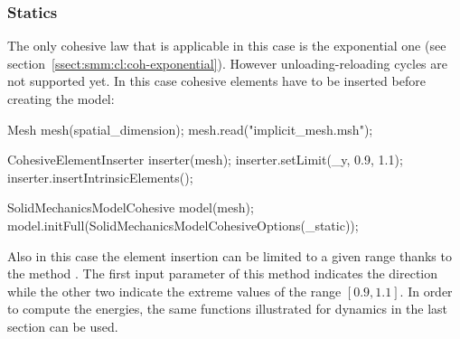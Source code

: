 \subsubsection{Statics}
The only cohesive law that is applicable in this case is the
exponential one (see
section~\ref{ssect:smm:cl:coh-exponential}). However
unloading-reloading cycles are not supported yet. In this case
cohesive elements have to be inserted before creating the
 model:
\begin{cpp}
  Mesh mesh(spatial_dimension);
  mesh.read("implicit_mesh.msh");

  CohesiveElementInserter inserter(mesh);
  inserter.setLimit(_y, 0.9, 1.1);
  inserter.insertIntrinsicElements();

  SolidMechanicsModelCohesive model(mesh);
  model.initFull(SolidMechanicsModelCohesiveOptions(_static));
\end{cpp}
Also in this case the element insertion can be limited to a given
range thanks to the method . The first input parameter
of this method indicates the direction while the other two indicate
the extreme values of the range $[0.9, 1.1]$. In order to compute the
energies, the same functions illustrated for dynamics in the last
section can be used.
